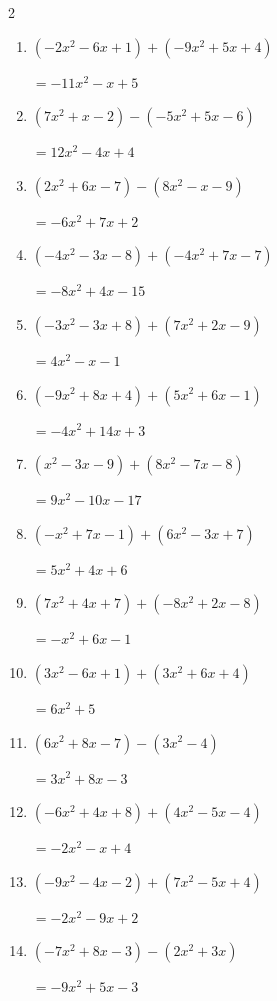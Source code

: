 \begin{multicols}{2}
\begin{enumerate}
        $=-11x^{2}-x-1$

  \item $(-2x^{2}-6x+1)+(-9x^{2}+5x+4)$

        $=-11x^{2}-x+5$

  \item $(7x^{2}+x-2)-(-5x^{2}+5x-6)$

        $=12x^{2}-4x+4$

  \item $(2x^{2}+6x-7)-(8x^{2}-x-9)$

        $=-6x^{2}+7x+2$

  \item $(-4x^{2}-3x-8)+(-4x^{2}+7x-7)$

        $=-8x^{2}+4x-15$

  \item $(-3x^{2}-3x+8)+(7x^{2}+2x-9)$

        $=4x^{2}-x-1$

  \item $(-9x^{2}+8x+4)+(5x^{2}+6x-1)$

        $=-4x^{2}+14x+3$

  \item $(x^{2}-3x-9)+(8x^{2}-7x-8)$

        $=9x^{2}-10x-17$

  \item $(-x^{2}+7x-1)+(6x^{2}-3x+7)$

        $=5x^{2}+4x+6$

  \item $(7x^{2}+4x+7)+(-8x^{2}+2x-8)$

        $=-x^{2}+6x-1$

  \item $(3x^{2}-6x+1)+(3x^{2}+6x+4)$

        $=6x^{2}+5$

  \item $(6x^{2}+8x-7)-(3x^{2}-4)$

        $=3x^{2}+8x-3$

  \item $(-6x^{2}+4x+8)+(4x^{2}-5x-4)$

        $=-2x^{2}-x+4$

  \item $(-9x^{2}-4x-2)+(7x^{2}-5x+4)$

        $=-2x^{2}-9x+2$

  \item $(-7x^{2}+8x-3)-(2x^{2}+3x)$

        $=-9x^{2}+5x-3$


\end{enumerate}
\end{multicols}
